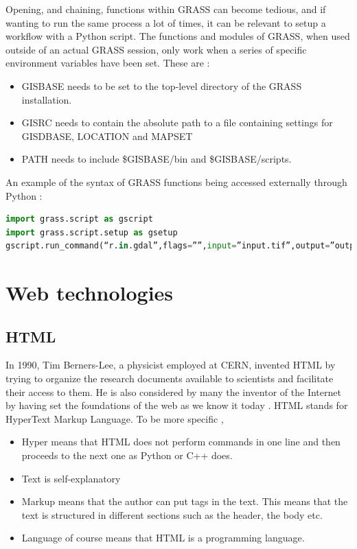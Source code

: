 Opening, and chaining, functions within GRASS can become tedious, and if wanting to run the same process a lot of times, it can be relevant to setup a workflow with a Python script.
The functions and modules of GRASS, when used outside of an actual GRASS session, only work when a series of specific environment variables have been set. 
These are \citep{grasswiki}:
\begin{itemize}
\item GISBASE needs to be set to the top-level directory of the GRASS installation. 
\item GISRC needs to contain the absolute path to a file containing settings for GISDBASE, LOCATION and MAPSET 
\item PATH needs to include \$GISBASE/bin and \$GISBASE/scripts.
\end{itemize}

An example of the syntax of GRASS functions being accessed externally through Python \citep{grasswiki}:

\begin{lstlisting}[language=Python]
import grass.script as gscript
import grass.script.setup as gsetup
gscript.run_command(“r.in.gdal”,flags=””,input=”input.tif”,output=”output”
\end{lstlisting}


\section{Web technologies}
\subsection{HTML}
In 1990, Tim Berners-Lee, a physicist employed at CERN, invented HTML by trying to organize the research documents available to scientists and facilitate their access to them. He is also considered by many the inventor of the Internet by having set the foundations of the web as we know it today \citep{htmlnet}.
HTML stands for HyperText Markup Language. To be more specific \citep{htmlnet},

\begin{itemize}
\item Hyper means that HTML does not perform commands in one line and then proceeds to the next one as Python or C++ does.
\item Text is self-explanatory
\item Markup means that the author can put tags in the text. This means that the text is structured in different sections such as the header, the body etc.
\item Language of course means that HTML is a programming language.
\end{itemize}

